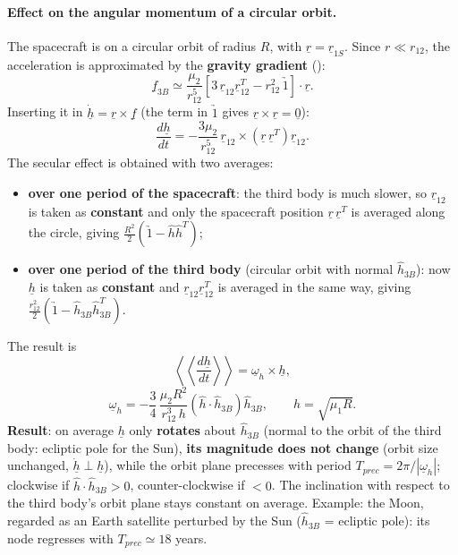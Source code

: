 \paragraph{Effect on the angular momentum of a circular orbit.} The spacecraft is on a circular orbit of radius $R$, with
$\underline r=\underline r_{1S}$. Since $r\ll r_{12}$, the acceleration is approximated by the \textbf{gravity gradient} ():
\begin{equation}
\underline f_{3B}\simeq\frac{\mu_2}{r_{12}^5}\left[3\,\underline r_{12}\underline r_{12}^T-r_{12}^2\,\underrightarrow{1}\right]\cdot\underline r .
\end{equation}
Inserting it in $\dot{\underline h}=\underline r\times\underline f$ (the term in $\underrightarrow{1}$ gives $\underline r\times\underline r=\underline 0$):
\begin{equation}
\frac{d\underline h}{dt}=-\frac{3\mu_2}{r_{12}^5}\,\underline r_{12}\times\left(\underline r\,\underline r^T\right)\underline r_{12}.
\end{equation}
The secular effect is obtained with two averages:
\begin{itemize}
\item \textbf{over one period of the spacecraft}: the third body is much slower, so $\underline r_{12}$ is taken as \textbf{constant} and only the
spacecraft position $\underline r\,\underline r^T$ is averaged along the circle, giving $\frac{R^2}{2}\left(\underrightarrow{1}-\hat h\hat h^T\right)$;
\item \textbf{over one period of the third body} (circular orbit with normal $\hat h_{3B}$): now $\underline h$ is taken as \textbf{constant} and
$\underline r_{12}\underline r_{12}^T$ is averaged in the same way, giving $\frac{r_{12}^2}{2}\left(\underrightarrow{1}-\hat h_{3B}\hat h_{3B}^T\right)$.
\end{itemize}
The result is
\begin{equation}
\left\langle\!\left\langle\frac{d\underline{h}}{dt}\right\rangle\!\right\rangle=\underline\omega_h\times\underline h,
\end{equation}
\begin{equation}
\underline{\omega}_{h}=-\frac{3}{4}\,\frac{\mu_{2}R^{2}}{r_{12}^{3}\,h}\left(\hat{h}\cdot\hat{h}_{3B}\right)\hat{h}_{3B},\qquad h=\sqrt{\mu_1R}.
\end{equation}
\textbf{Result}: on average $\underline h$ only \textbf{rotates} about $\hat h_{3B}$ (normal to the orbit of the third body: ecliptic pole for the Sun),
\textbf{its magnitude does not change} (orbit size unchanged, $\dot{\underline h}\perp\underline h$), while the orbit plane precesses with
period $T_{prec}=2\pi/|\underline\omega_h|$; clockwise if $\hat h\cdot\hat h_{3B}>0$, counter-clockwise if $<0$. The inclination with respect to
the third body's orbit plane stays constant on average.
Example: the Moon, regarded as an Earth satellite perturbed by the Sun ($\hat h_{3B}$ = ecliptic pole): its node regresses with
$T_{prec}\simeq18$ years.

